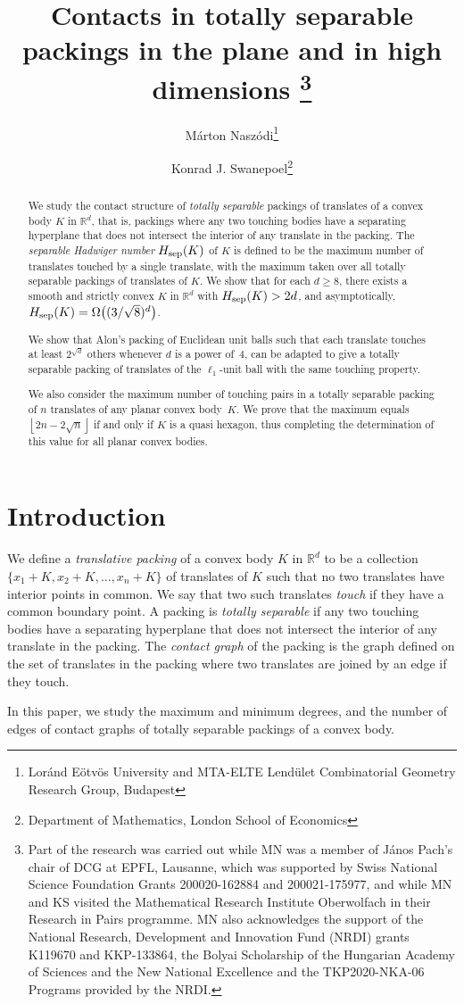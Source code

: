 \documentclass[a4paper,12pt]{article}
\author{M\'arton Nasz\'odi\footnote{
Lor\'and E\"otv\"os University and
MTA-ELTE Lend\"ulet Combinatorial Geometry Research Group, Budapest}
\and Konrad J. Swanepoel\footnote{Department of Mathematics, London School of 
Economics}}
\title{%
Contacts in totally separable packings in the plane and in high dimensions%
\footnote{Part of the research was carried out while MN was a member of 
J\'anos Pach's chair of DCG at EPFL, Lausanne, which was supported by Swiss 
National Science Foundation Grants 200020-162884 and 200021-175977, and while 
MN and KS visited the Mathematical Research Institute Oberwolfach in their 
Research in Pairs programme.
MN also acknowledges the support of the National Research, Development and 
Innovation Fund (NRDI) grants K119670 and KKP-133864, the Bolyai Scholarship of the Hungarian Academy of Sciences and the New National Excellence and the TKP2020-NKA-06 Programs provided by the NRDI.}}\date{}
\theoremstyle{plain}
\theoremstyle{definition}
\newcommand{\numbersystem}[1]{\mathbb{#1}}
\newcommand{\bR}{\numbersystem{R}}
\newcommand{\floor}[1]{\left\lfloor#1\right\rfloor}
\newcommand{\Hsep}{H_{\textnormal{sep}}}
\begin{document}
\maketitle
\begin{abstract}
We study the contact structure of \emph{totally separable} packings of 
translates of a convex body $K$ in $\bR^d$, that is, packings where any 
two touching bodies have a separating hyperplane that does not intersect 
the interior of any translate in the packing.
The \emph{separable Hadwiger number} $\Hsep(K)$ of $K$ is defined to be the maximum number of translates touched by a single translate, with the maximum taken over all totally separable packings of translates of $K$.
We show that for each $d\geq 8$, there exists a smooth and strictly convex $K$ in $\bR^d$ with $\Hsep(K)>2d$, and asymptotically, $\Hsep(K)=\upOmega\bigl((3/\sqrt{8})^d\bigr)$.

We show that Alon's packing of Euclidean unit balls such that each translate touches at least $2^{\sqrt{d}}$ others whenever $d$ is a power of~$4$, can be adapted to give a totally separable packing of translates of the $\ell_1$-unit ball with the same touching property.

We also consider the maximum number of touching pairs in a 
totally separable packing of $n$ translates of any planar convex body~$K$.
We prove that the maximum equals $\floor{2n-2\sqrt{n}}$ if and only if $K$ is a quasi hexagon, thus completing the determination of this value for all planar convex bodies.
\end{abstract}

\section{Introduction}
We define a \emph{translative packing} of a convex body $K$ in $\bR^d$ to be a collection $\{x_1+K,x_2+K,\dots,x_n+K\}$ of translates of $K$ %
such that no two translates have interior points in common.
We say that two such translates \emph{touch} if they have a common boundary point.
A packing is \emph{totally separable} if any two touching bodies have 
a separating hyperplane that does not intersect the interior of any translate 
in the packing. The \emph{contact graph} of the packing is the graph defined on the set of translates in the packing where two translates are joined by an edge if they touch.

In this paper, we study the maximum and minimum degrees, and the number of 
edges of contact graphs of totally separable packings of a convex body.
\end{document}
